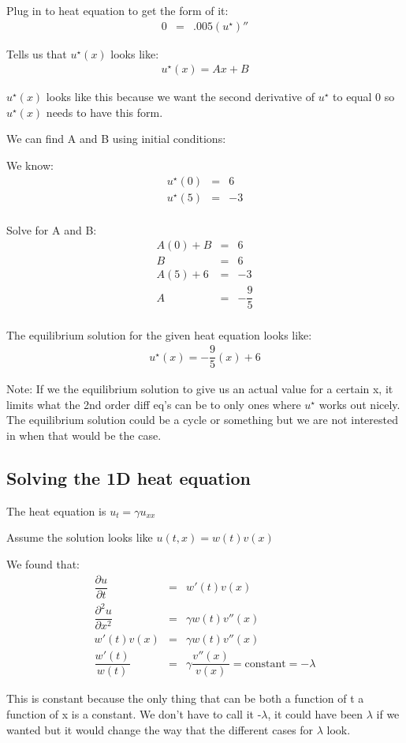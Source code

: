 \documentclass{article}
\newcommand{\bea}{\begin{eqnarray*}}
\newcommand{\eea}{\end{eqnarray*}}
\newcommand{\blue}[1]{\textcolor{blue}{#1}}
\begin{document}
Plug in to heat equation to get the form of it:
\bea
0 &=& .005(u^{\star})''
\eea

Tells us that $u^{\star}(x)$ looks like:
\bea
u^{\star}(x) = Ax + B
\eea

$u^{\star}(x)$ looks like this because we want the second derivative of $u^{\star}$ to equal 0 so $u^{\star}(x)$ needs to have this form. 

We can find A and B using initial conditions:

We know:
\bea
u^{\star}(0) &=& 6 \\
u^{\star}(5) &=& -3 \\
\eea

Solve for A and B:
\bea
A(0) + B &=& 6\\
B &=& 6 \\
A(5) + 6 &=& -3 \\
A &=& -\dfrac{9}{5} \\
\eea

The equilibrium solution for the given heat equation looks like:
\bea
u^{\star}(x)=-\dfrac{9}{5}(x) + 6
\eea

Note: If we the equilibrium solution to give us an actual value for a certain x, it limits what the 2nd order diff eq's can be to only ones where $u^{\star}$ works out nicely. The equilibrium solution could be a cycle or something but we are not interested in when that would be the case. 

\subsection{Solving the 1D heat equation}
The heat equation is $u_t = \gamma u_{xx}$

Assume the solution looks like $u(t,x) = w(t)v(x)$

We found that:
\bea
\dfrac{\partial u}{\partial t} &=& w'(t)v(x) \\
\dfrac{\partial^2 u}{\partial x^2} &=& \gamma w(t)v''(x) \\
w'(t)v(x) &=& \gamma w(t)v''(x) \\
\dfrac{w'(t)}{w(t)} &=& \gamma \dfrac{v''(x)}{v(x)} = \mbox{constant} = -\lambda
\eea

This is constant because the only thing that can be both a function of t a function of x is a constant. We don't have to call it -$\lambda$, it could have been $\lambda$ if we wanted but it would change the way that the different cases for $\lambda$ look. \newline
\end{document}
